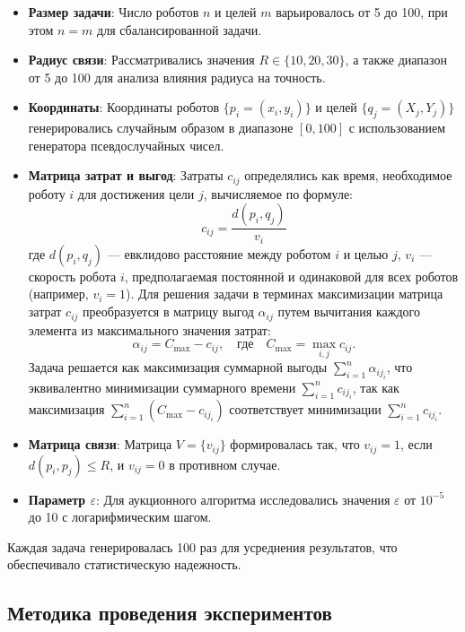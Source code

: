 \begin{itemize}
    \item \textbf{Размер задачи}: Число роботов \( n \) и целей \( m \) варьировалось от 5 до 100, при этом \( n = m \) для сбалансированной задачи.
    \item \textbf{Радиус связи}: Рассматривались значения \( R \in \{10, 20, 30\} \), а также диапазон от 5 до 100 для анализа влияния радиуса на точность.
    \item \textbf{Координаты}: Координаты роботов \( \{p_i = (x_i, y_i)\} \) и целей \( \{q_j = (X_j, Y_j)\} \) генерировались случайным образом в диапазоне \( [0, 100] \) с использованием генератора псевдослучайных чисел.
     \item \textbf{Матрица затрат и выгод}: Затраты \( c_{ij} \) определялись как время, необходимое роботу \( i \) для достижения цели \( j \), вычисляемое по формуле:
    \[
    c_{ij} = \frac{d(p_i, q_j)}{v_i}
    \]
    где \( d(p_i, q_j) \) --- евклидово расстояние между роботом \( i \) и целью \( j \), \( v_i \) --- скорость робота \( i \), предполагаемая постоянной и одинаковой для всех роботов (например, \( v_i = 1 \)). Для решения задачи в терминах максимизации матрица затрат \( c_{ij} \) преобразуется в матрицу выгод \( \alpha_{ij} \) путем вычитания каждого элемента из максимального значения затрат:
    \[
    \alpha_{ij} = C_{\text{max}} - c_{ij}, \quad \text{где} \quad C_{\text{max}} = \max_{i,j} c_{ij}.
    \]
    Задача решается как максимизация суммарной выгоды \( \sum_{i=1}^n \alpha_{i j_i} \), что эквивалентно минимизации суммарного времени \( \sum_{i=1}^n c_{i j_i} \), так как максимизация \( \sum_{i=1}^n (C_{\text{max}} - c_{i j_i}) \) соответствует минимизации \( \sum_{i=1}^n c_{i j_i} \).
    \item \textbf{Матрица связи}: Матрица \( V = \{v_{ij}\} \) формировалась так, что \( v_{ij} = 1 \), если \( d(p_i, p_j) \leq R \), и \( v_{ij} = 0 \) в противном случае.
    \item \textbf{Параметр \( \varepsilon \)}: Для аукционного алгоритма исследовались значения \( \varepsilon \) от \( 10^{-5} \) до 10 с логарифмическим шагом.
\end{itemize}

Каждая задача генерировалась 100 раз для усреднения результатов, что обеспечивало статистическую надежность.

\subsection{Методика проведения экспериментов}

